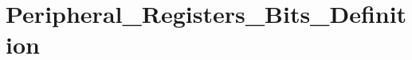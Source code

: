 \hypertarget{group___peripheral___registers___bits___definition}{\section{Peripheral\-\_\-\-Registers\-\_\-\-Bits\-\_\-\-Definition}
\label{group___peripheral___registers___bits___definition}
}
